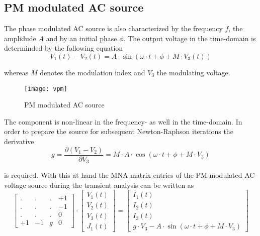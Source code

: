 \subsection{PM modulated AC source}

The phase modulated AC source is also characterized by the frequency
$f$, the amplidude $A$ and by an initial phase $\phi$.  The output
voltage in the time-domain is determinded by the following equation
\begin{equation}
V_1\left(t\right) - V_2\left(t\right) = A\cdot\sin{\left(\omega\cdot t + \phi + M\cdot V_3\left(t\right)\right)}
\end{equation}

whereas $M$ denotes the modulation index and $V_3$ the modulating
voltage.

\begin{figure}[ht]
\begin{center}
\texttt{[image: vpm]}
\end{center}
\label{fig:VPM}
\caption{PM modulated AC source}
\end{figure}
\FloatBarrier

The component is non-linear in the frequency- as well in the
time-domain.  In order to prepare the source for subsequent
Newton-Raphson iterations the derivative
\begin{equation}
g = \dfrac{\partial \left(V_1 - V_2\right)}{\partial V_3} = M\cdot A\cdot\cos{\left(\omega\cdot t + \phi + M\cdot V_3\right)}
\end{equation}

is required.  With this at hand the MNA matrix entries of the PM
modulated AC voltage source during the transient analysis can be
written as
\begin{equation}
\begin{bmatrix}
. & . & . & +1\\
. & . & . & -1\\
. & . & . & 0\\
+1 & -1 & g & 0
\end{bmatrix}
\cdot
\begin{bmatrix}
V_1\left(t\right)\\
V_2\left(t\right)\\
V_3\left(t\right)\\
J_1\left(t\right)
\end{bmatrix}
=
\begin{bmatrix}
I_1\left(t\right)\\
I_2\left(t\right)\\
I_3\left(t\right)\\
g\cdot V_3 - A\cdot \sin{\left(\omega\cdot t + \phi + M\cdot V_3\right)}
\end{bmatrix}
\end{equation}

